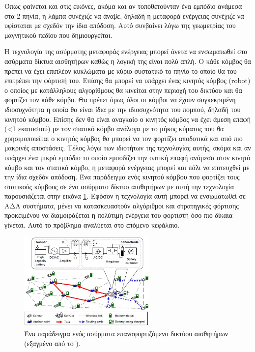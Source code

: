 Όπως φαίνεται και στις εικόνες, ακόμα και αν τοποθετούνταν ένα εμπόδιο ανάμεσα στα 2 πηνία, η λάμπα συνέχιζε να άναβε, δηλαδή η μεταφορά ενέργειας συνέχιζε να
υφίσταται με σχεδόν την ίδια απόδοση. Αυτό συνβαίνει λόγω της γεωμετρίας του μαγνητικού πεδίου που δημιουργείται.

Η τεχνολογία της ασύρματης μεταφοράς ενέργειας μπορεί άνετα να ενσωματωθεί στα ασύρματα δίκτυα αισθητήρων καθώς η λογική της είναι πολύ απλή. Ο κάθε κόμβος θα πρέπει
να έχει επιπλέον κυκλώματα με κύριο συστατικό το πηνίο το οποίο θα του επιτρέπει την φόρτισή του. Επίσης θα μπορεί να υπάρχει ένας κινητός κόμβος (robot) ο οποίος με
κατάλληλους αλγορίθμους θα κινείται στην περιοχή του δικτύου και θα φορτίζει τον κάθε κόμβο. Θα πρέπει όμως όλοι οι κόμβοι να έχουν συγκεκριμένη ιδιοσυχνότητα η
οποία θα είναι ίδια με την ιδιοσυχνότητα του πομπού, δηλαδή του κινητού κόμβου. Επίσης δεν θα είναι αναγκαίο ο κινητός κόμβος να έχει άμεση επαφή (<1 εκατοστού) με
τον στατικό κόμβο ανάλογα με το μήκος κύματος που θα χρησιμοποιείται ο κινητός κόμβος θα μπορεί να τον φορτίζει αποδοτικά και από πιο μακρινές αποστάσεις. Τέλος λόγω
των ιδιοτήτων της τεχνολογίας αυτής, ακόμα και αν υπάρχει ένα μικρό εμπόδιο το οποίο εμποδίζει την οπτική επαφή ανάμεσα στον κινητό κόμβο και τον στατικό κόμβο, η
μεταφορά ενέργειας μπορεί και πάλι να επιτευχθεί με την ίδια σχεδόν απόδοση. Ένα παράδειγμα ενός κινητού κόμβου που φορτίζει τους στατικούς κόμβους σε ένα ασύρματο
δίκτυο αισθητήρων με αυτή την τεχνολογία παρουσιάζεται στην εικόνα \ref{fig:wrsn_example}. Εφόσον η τεχνολογία αυτή μπορεί να ενσωματωθεί σε ΑΔΑ συστήματα, μένει να
κατασκευαστούν αλγόριθμοι και στρατηγικές φόρτισης προκειμένου να διαμοιράζεται η πολύτιμη ενέργεια του φορτιστή όσο πιο δίκαια γίνεται. Αυτό το πρόβλημα αναλύεται
στο επόμενο κεφάλαιο.


\begin{figure}[h]
	\centering
	\includegraphics[width=0.6\textwidth]{images/sencar_example.jpg}
	\caption{Ένα παράδειγμα ενός ασύρματα επαναφορτιζόμενο δικτύου αισθητήρων (εξαγμένο από το \cite{yuanyuan_joint}).}
	\label{fig:wrsn_example}
\end{figure}
